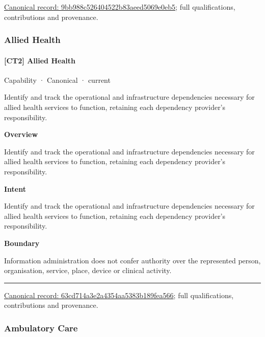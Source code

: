{\footnotesize \href{../../../../continuum/strategy/capability/9bb988c526404522b83aeed5069e0eb5.md}{Canonical record: 9bb988c526404522b83aeed5069e0eb5}; full qualifications, contributions and provenance.}\par
\subsubsection{Allied Health}

\paragraph{[CT2] Allied Health}

\label{element:63cd714a3e2a4354aa5383b189fea566}
{\small Capability · Canonical · current}\par

Identify and track the operational and infrastructure dependencies necessary for allied health services to function, retaining each dependency provider's responsibility.



\textbf{Overview}



Identify and track the operational and infrastructure dependencies necessary for allied health services to function, retaining each dependency provider's responsibility.



\textbf{Intent}



Identify and track the operational and infrastructure dependencies necessary for allied health services to function, retaining each dependency provider's responsibility.



\textbf{Boundary}



Information administration does not confer authority over the represented person, organisation, service, place, device or clinical activity.



\medskip\hrule\medskip

{\footnotesize \href{../../../../continuum/strategy/capability/63cd714a3e2a4354aa5383b189fea566.md}{Canonical record: 63cd714a3e2a4354aa5383b189fea566}; full qualifications, contributions and provenance.}\par
\subsubsection{Ambulatory Care}

